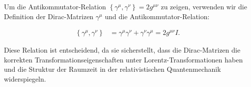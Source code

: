 \documentclass[11pt,a4paper]{article}
\begin{document}
Um die Antikommutator-Relation $\left\{\gamma^\mu, \gamma^\nu\right\} = 2 g^{\mu \nu}$ zu zeigen, verwenden wir die Definition der Dirac-Matrizen $\gamma^\mu$ und die Antikommutator-Relation:

\begin{align*}
\left\{\gamma^\mu, \gamma^\nu\right\} &= \gamma^\mu \gamma^\nu + \gamma^\nu \gamma^\mu = 2 g^{\mu \nu} I.
\end{align*}

Diese Relation ist entscheidend, da sie sicherstellt, dass die Dirac-Matrizen die korrekten Transformationseigenschaften unter Lorentz-Transformationen haben und die Struktur der Raumzeit in der relativistischen Quantenmechanik widerspiegeln.

\end{document}
